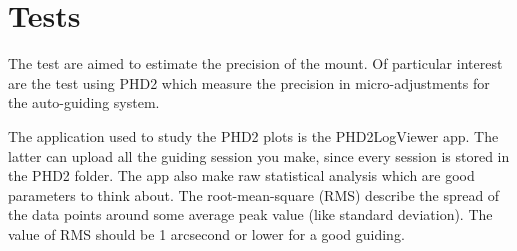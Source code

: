 \section{Tests}
\label{sec:tests}
The test are aimed to estimate the precision of the mount.
Of particular interest are the test using PHD2 which measure the precision in micro-adjustments for the auto-guiding system.

The application used to study the PHD2 plots is the PHD2LogViewer app.
The latter can upload all the guiding session you make, since every session is stored in the PHD2 folder.
The app also make raw statistical analysis which are good parameters to think about.
The root-mean-square (RMS) describe the spread of the data points around some average peak value (like standard deviation).
The value of RMS should be 1 arcsecond or lower for a good guiding.

